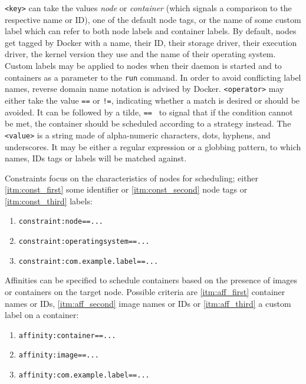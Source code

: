     \texttt{<key>} can take the values \emph{node} or \emph{container} (which signals a comparison to the respective name or \ac{ID}), one of the default node tags, or the name of some custom label which can refer to both node labels and container labels. By default, nodes get tagged by Docker with a name, their \ac{ID}, their storage driver, their execution driver, the kernel version they use and the name of their operating system.
    Custom labels may be applied to nodes when their daemon is started and to containers as a parameter to the \texttt{run} command. In order to avoid conflicting label names, reverse domain name notation is advised by Docker.
    \texttt{<operator>} may either take the value \texttt{==} or \texttt{!=}, indicating whether a match is desired or should be avoided. It can be followed by a tilde, \eg \texttt{==~} to signal that if the condition cannot be met, the container should be scheduled according to a strategy instead.
    The \texttt{<value>} is a string made of alpha-numeric characters, dots, hyphens, and underscores. It may be either a regular expression or a globbing pattern, to which names, \acp{ID} tags or labels will be matched against.

    Constraints focus on the characteristics of nodes for scheduling; either \ref{itm:const_first} some identifier or \ref{itm:const_second} node tags or \ref{itm:const_third} labels:

    \begin{enumerate}[label=\alph*), nosep]
      \item \label{itm:const_first} \texttt{constraint:node==...}
      \item \label{itm:const_second} \texttt{constraint:operatingsystem==...}
      \item \label{itm:const_third} \texttt{constraint:com.example.label==...}
    \end{enumerate}

    Affinities can be specified to schedule containers based on the presence of images or containers on the target node. Possible criteria are \ref{itm:aff_first} container names or \acp{ID}, \ref{itm:aff_second} image names or \acp{ID} or \ref{itm:aff_third} a custom label on a container:

    \begin{enumerate}[label=\alph*), nosep]
      \item \label{itm:aff_first} \texttt{affinity:container==...}
      \item \label{itm:aff_second} \texttt{affinity:image==...}
      \item \label{itm:aff_third} \texttt{affinity:com.example.label==...}
    \end{enumerate}

